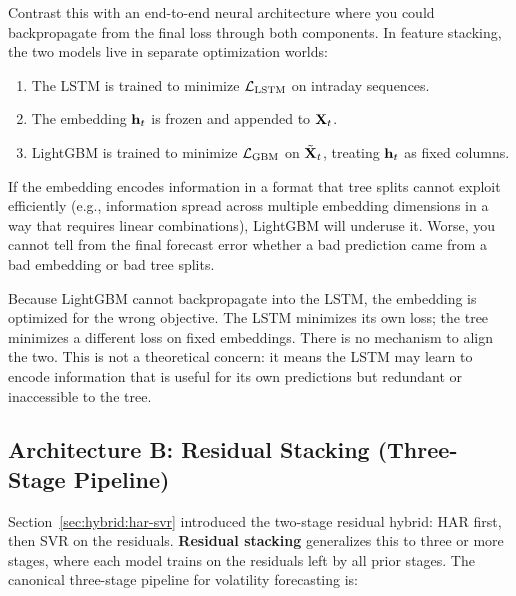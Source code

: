 Contrast this with an end-to-end neural architecture where you could
backpropagate from the final loss through both components.  In feature
stacking, the two models live in separate optimization worlds:

\begin{enumerate}
  \item The LSTM is trained to minimize $\mathcal{L}_{\text{LSTM}}$ on
        intraday sequences.
  \item The embedding $\mathbf{h}_t$ is frozen and appended to $\mathbf{X}_t$.
  \item LightGBM is trained to minimize $\mathcal{L}_{\text{GBM}}$ on
        $\tilde{\mathbf{X}}_t$, treating $\mathbf{h}_t$ as fixed columns.
\end{enumerate}

If the embedding encodes information in a format that tree splits
cannot exploit efficiently (e.g., information spread across multiple
embedding dimensions in a way that requires linear combinations),
LightGBM will underuse it.  Worse, you cannot tell from the final
forecast error whether a bad prediction came from a bad embedding or
bad tree splits.

\begin{warning}
Because LightGBM cannot backpropagate into the LSTM, the embedding is
optimized for the wrong objective.  The LSTM minimizes its own loss;
the tree minimizes a different loss on fixed embeddings.  There is no
mechanism to align the two.  This is not a theoretical concern: it
means the LSTM may learn to encode information that is useful for its
own predictions but redundant or inaccessible to the tree.
\end{warning}


\subsection{Architecture B: Residual Stacking (Three-Stage Pipeline)}
\label{sec:hybrid:resid-stack-3}

Section~\ref{sec:hybrid:har-svr} introduced the two-stage residual
hybrid: HAR first, then SVR on the residuals.  \textbf{Residual
stacking} generalizes this to three or more stages, where each model
trains on the residuals left by all prior stages.  The canonical
three-stage pipeline for volatility forecasting is:

